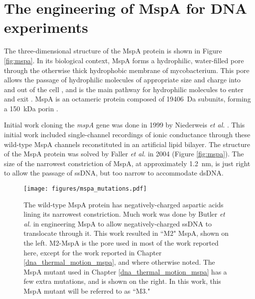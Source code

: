\section{The engineering of MspA for DNA experiments}

The three-dimensional structure of the MspA protein is shown in Figure \ref{fig:mspa}.  In its biological context, MspA forms a hydrophilic, water-filled pore through the otherwise thick hydrophobic membrane of mycobacterium.  This pore allows the passage of hydrophilic molecules of appropriate size and charge into and out of the cell \citep{Niederweis1999}, and is the main pathway for hydrophilic molecules to enter and exit \citep{Stahl2001}.  MspA is an octameric protein composed of \SI{19406}{\dalton} subunits, forming a \SI{150}{\kilo\dalton} porin \citep{Niederweis1999}.

Initial work cloning the \textit{mspA} gene was done in 1999 by Niederweis \textit{et al.} \citep{Niederweis1999}.  This initial work  included single-channel recordings of ionic conductance through these wild-type MspA channels reconstituted in an artificial lipid bilayer.  The structure of the MspA protein was solved by Faller \textit{et al.} in 2004 \citep{Faller2004} (Figure \ref{fig:mspa}).  The size of the narrowest constriction of MspA, at approximately \SI{1.2}{\nm}, is just right to allow the passage of ssDNA, but too narrow to accommodate dsDNA.

\begin{figure}[h]
\begin{centering}
\texttt{[image: figures/mspa\_mutations.pdf]}
\caption[Genetic engineering of MspA]{The wild-type MspA protein has negatively-charged aspartic acids lining its narrowest constriction.  Much work was done by Butler \textit{et al.} \citep{Butler2008} in engineering MspA to allow negatively-charged ssDNA to translocate through it.  This work resulted in ``M2" MspA, shown on the left.  M2-MspA is the pore used in most of the work reported here, except for the work reported in Chapter \ref{dna_thermal_motion_mspa}, and where otherwise noted.  The MspA mutant used in Chapter \ref{dna_thermal_motion_mspa} has a few extra mutations, and is shown on the right.  In this work, this MspA mutant will be referred to as ``M3."}
\label{fig:mspa_engineering}
\end{centering}
\end{figure}

